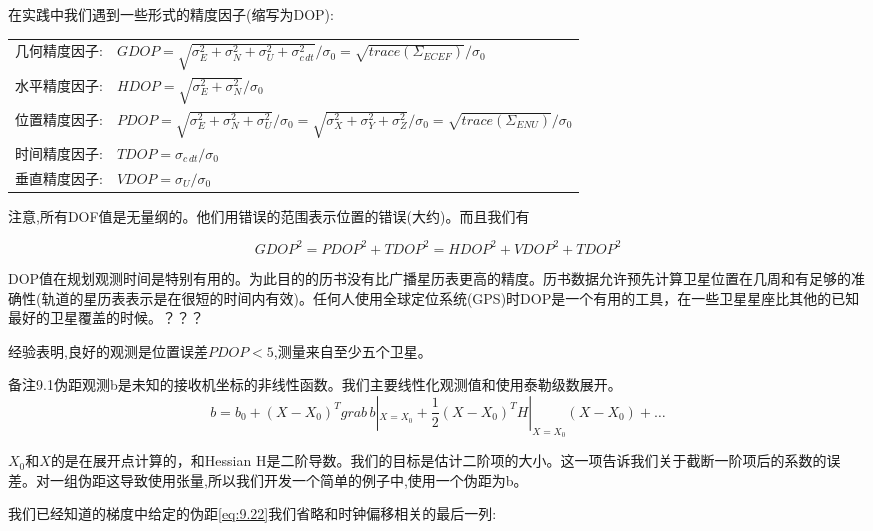 	在实践中我们遇到一些形式的精度因子(缩写为DOP):

		\begin{table}

			\begin{tabularx}{\textwidth}{lX}

				几何精度因子: & $GDOP=\sqrt{\sigma^2_E+\sigma^2_N+\sigma^2_U+\sigma^2_{c\,dt}}/\sigma_0=\sqrt{trace(\Sigma_{ECEF})}/\sigma_0$ \\

				水平精度因子:&$HDOP=\sqrt{\sigma^2_E+\sigma^2_N}/\sigma_0$ \\

				位置精度因子:  & $PDOP=\sqrt{\sigma^2_E+\sigma^2_N+\sigma^2_U}/\sigma_0=\sqrt{\sigma^2_X+\sigma^2_Y+\sigma^2_Z}/\sigma_0=\sqrt{trace(\Sigma_{ENU})}/\sigma_0 $ \\

				时间精度因子:	   &$TDOP=\sigma_{c\,dt}/\sigma_0$ \\

				垂直精度因子:  &$VDOP=\sigma_U/\sigma_0$ 

			\end{tabularx}

		\end{table}

	注意,所有DOF值是无量纲的。他们用错误的范围表示位置的错误(大约)。而且我们有

		\[

			GDOP^2=PDOP^2+TDOP^2=HDOP^2+VDOP^2+TDOP^2

		\]

	DOP值在规划观测时间是特别有用的。为此目的的历书没有比广播星历表更高的精度。历书数据允许预先计算卫星位置在几周和有足够的准确性(轨道的星历表表示是在很短的时间内有效)。任何人使用全球定位系统(GPS)时DOP是一个有用的工具，在一些卫星星座比其他的已知最好的卫星覆盖的时候。？？？

	经验表明,良好的观测是位置误差$PDOP<5$,测量来自至少五个卫星。

	备注9.1伪距观测b是未知的接收机坐标的非线性函数。我们主要线性化观测值和使用泰勒级数展开。
		\[

			b=b_0+(X-X_0)^Tgrab\,b|_{X=X_0}+\frac{1}{2}(X-X_0)^TH|_{X=X_0}(X-X_0)+\ldots

		\]	

	$X_0$和$X$的是在展开点计算的，和Hessian H是二阶导数。我们的目标是估计二阶项的大小。这一项告诉我们关于截断一阶项后的系数的误差。对一组伪距这导致使用张量,所以我们开发一个简单的例子中,使用一个伪距为b。
			
	我们已经知道的梯度中给定的伪距\ref{eq:9.22}我们省略和时钟偏移相关的最后一列:

